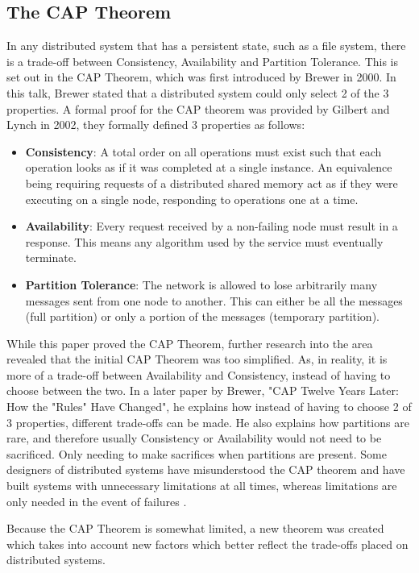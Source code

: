 \documentclass[12pt]{report}
\begin{document}
\subsection{The CAP Theorem}
In any distributed system that has a persistent state, such as a file system, there is a trade-off between Consistency, Availability and Partition Tolerance.
This is set out in the CAP Theorem, which was first introduced by Brewer in 2000\cite{CAPTheorem}. In this talk, Brewer stated that a distributed system could only select 2 of the 3 properties. A formal proof for the CAP theorem was provided by Gilbert and Lynch in 2002\cite{10.1145/564585.564601}, they formally defined 3 properties as follows:
\begin{itemize}
    \item \textbf{Consistency}: A total order on all operations must exist such that each operation looks as if it was completed at a single instance. An equivalence being requiring requests of a distributed shared memory act as if they were executing on a single node, responding to operations one at a time.
    \item \textbf{Availability}: Every request received by a non-failing node must result in a response.  This means any algorithm used by the service must eventually terminate.
    \item \textbf{Partition Tolerance}: The network is allowed to lose arbitrarily many messages sent from one node to another. This can either be all the messages (full partition) or only a portion of the messages (temporary partition).
\end{itemize}
While this paper proved the CAP Theorem, further research into the area revealed that the initial CAP Theorem was too simplified. As, in reality, it is more of a trade-off between Availability and Consistency, instead of having to choose between the two. In a later paper by Brewer, "CAP Twelve Years Later: How the "Rules" Have Changed"\cite{6133253}, he explains how instead of having to choose 2 of 3 properties, different trade-offs can be made. He also explains how partitions are rare, and therefore usually Consistency or Availability would not need to be sacrificed. Only needing to make sacrifices when partitions are present. Some designers of distributed systems have misunderstood the CAP theorem and have built systems with unnecessary limitations at all times, whereas limitations are only needed in the event of failures \cite{6133253}. \par
Because the CAP Theorem is somewhat limited, a new theorem was created which takes into account new factors which better reflect the trade-offs placed on distributed systems.
\end{document}
